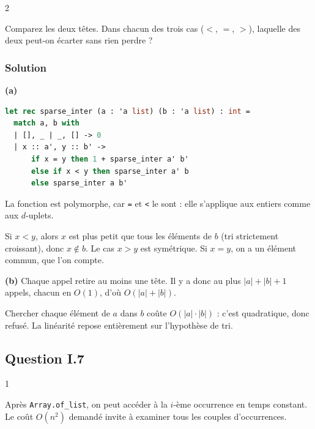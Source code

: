 \documentclass[11pt,a4paper]{article}
\begin{document}
\begin{indication}{2}

Comparez les deux têtes. Dans chacun des trois cas (\(<\), \(=\), \(>\)), laquelle des deux peut-on écarter sans rien perdre ?

\end{indication}

\hypertarget{solution-5}{%
\subsubsection{Solution}\label{solution-5}}

\textbf{(a)}

\begin{lstlisting}[language=Caml]
let rec sparse_inter (a : 'a list) (b : 'a list) : int =
  match a, b with
  | [], _ | _, [] -> 0
  | x :: a', y :: b' ->
      if x = y then 1 + sparse_inter a' b'
      else if x < y then sparse_inter a' b
      else sparse_inter a b'
\end{lstlisting}

La fonction est polymorphe, car \texttt{=} et \texttt{\textless{}} le sont : elle s'applique aux entiers comme aux \(d\)-uplets.

Si \(x<y\), alors \(x\) est plus petit que tous les éléments de \(b\) (tri strictement croissant), donc \(x\notin b\). Le cas \(x>y\) est symétrique. Si \(x=y\), on a un élément commun, que l'on compte.

\textbf{(b)} Chaque appel retire au moins une tête. Il y a donc au plus \(|a|+|b|+1\) appels, chacun en \(O(1)\), d'où \(\boxed{O(|a|+|b|)}\).

\begin{piege}

Chercher chaque élément de \(a\) dans \(b\) coûte \(O(|a|\cdot|b|)\) : c'est quadratique, donc refusé. La linéarité repose entièrement sur l'hypothèse de tri.

\end{piege}

\hypertarget{question-i.7}{%
\subsection{Question I.7}\label{question-i.7}}

\begin{indication}{1}

Après \texttt{Array.of\_list}, on peut accéder à la \(i\)-ème occurrence en temps constant. Le coût \(O(n^2)\) demandé invite à examiner tous les couples d'occurrences.

\end{indication}
\end{document}

